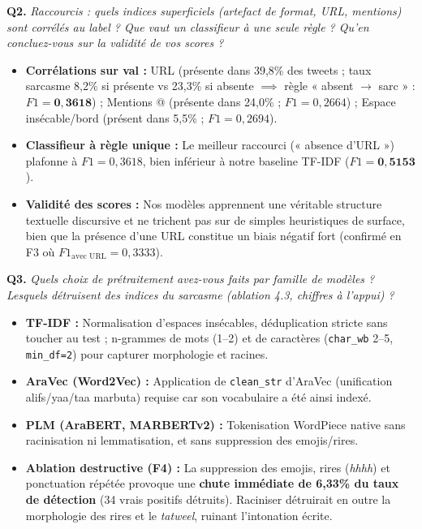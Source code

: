 \documentclass[10pt,a4paper]{article}
\newcommand{\questiontitle}[2]{%
  \noindent\textbf{#1.} \textit{#2}\par\vspace{1.5pt}%
}
\begin{document}
\questiontitle{Q2}{Raccourcis : quels indices superficiels (artefact de format, URL, mentions) sont corrélés au label ? Que vaut un classifieur à une seule règle ? Qu'en concluez-vous sur la validité de vos scores ?}
\begin{tcolorbox}[reponsebox]
  \begin{itemize}
    \item \textbf{Corrélations sur val :} URL (présente dans 39,8\% des tweets ; taux sarcasme 8,2\% si présente vs 23,3\% si absente $\implies$ règle « absent $\rightarrow$ sarc » : $F1 = \mathbf{0{,}3618}$) ; Mentions @ (présente dans 24,0\% ; $F1 = 0{,}2664$) ; Espace insécable/bord (présent dans 5,5\% ; $F1 = 0{,}2694$).
    \item \textbf{Classifieur à règle unique :} Le meilleur raccourci (« absence d'URL ») plafonne à $F1 = 0{,}3618$, bien inférieur à notre baseline TF-IDF ($F1 = \mathbf{0{,}5153}$).
    \item \textbf{Validité des scores :} Nos modèles apprennent une véritable structure textuelle discursive et ne trichent pas sur de simples heuristiques de surface, bien que la présence d'une URL constitue un biais négatif fort (confirmé en F3 où $F1_{\text{avec URL}} = 0{,}3333$).
  \end{itemize}
\end{tcolorbox}

\newpage

\questiontitle{Q3}{Quels choix de prétraitement avez-vous faits par famille de modèles ? Lesquels détruisent des indices du sarcasme (ablation 4.3, chiffres à l'appui) ?}
\begin{tcolorbox}[reponsebox]
  \begin{itemize}
    \item \textbf{TF-IDF :} Normalisation d'espaces insécables, déduplication stricte sans toucher au test ; n-grammes de mots (1--2) et de caractères (\texttt{char\_wb} 2--5, \texttt{min\_df=2}) pour capturer morphologie et racines.
    \item \textbf{AraVec (Word2Vec) :} Application de \texttt{clean\_str} d'AraVec (unification alifs/yaa/taa marbuta) requise car son vocabulaire a été ainsi indexé.
    \item \textbf{PLM (AraBERT, MARBERTv2) :} Tokenisation WordPiece native sans racinisation ni lemmatisation, et sans suppression des emojis/rires.
    \item \textbf{Ablation destructive (F4) :} La suppression des emojis, rires (\textit{hhhh}) et ponctuation répétée provoque une \textbf{chute immédiate de 6,33\% du taux de détection} (34 vrais positifs détruits). Raciniser détruirait en outre la morphologie des rires et le \textit{tatweel}, ruinant l'intonation écrite.
  \end{itemize}
\end{tcolorbox}
\end{document}
